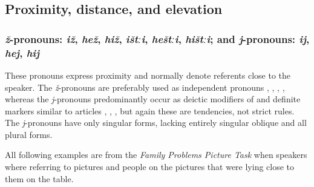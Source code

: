 \subsection{Proximity, distance, and elevation}
\label{ssec:Proximity, distance, cardinal directions, and height The six horizontal series}



\subsubsection{\textit{ž}-pronouns: \textit{iž}, \textit{hež}, \textit{hiž}, \textit{ištːi}, \textit{heštːi}, \textit{hištːi}; and \textit{j}-pronouns: \textit{ij}, \textit{hej}, \textit{hij}}
\label{sssec:z-pronouns j-pronouns}

These pronouns express proximity and normally denote referents close to the speaker. The \textit{ž}-pronouns are preferably used as independent pronouns , , , , whereas the \textit{j}-pronouns predominantly occur as deictic modifiers of  and definite markers similar to articles , , , but again these are tendencies, not strict rules. The \textit{j}-pronouns have only singular  forms, lacking entirely singular oblique and all plural forms.

All following examples are from the \textit{Family Problems Picture Task} when speakers where referring to pictures and people on the pictures that were lying close to them on the table.

